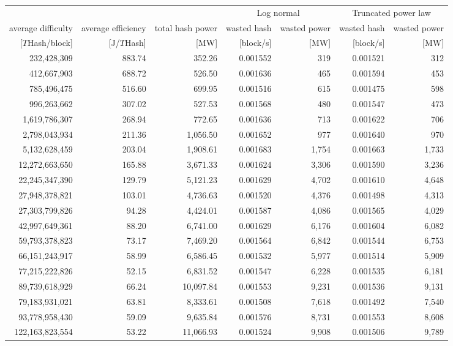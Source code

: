 \begin{tabular}{@{}rrrrrrr@{}}
\toprule
 &  &  & \multicolumn{2}{c}{Log normal} & \multicolumn{2}{c}{Truncated power law}\\
\cmidrule(lr){4-5} \cmidrule(lr){6-7} 
average difficulty & average efficiency & total hash power & wasted hash & wasted power & wasted hash & wasted power\\
$[T$Hash/block] & [J/$T$Hash] & [MW] & [block/s] & [MW] & [block/s] & [MW]\\
\cmidrule(lr){1-7}
232,428,309 & 883.74 & 352.26 & 0.001552 & 319 & 0.001521 & 312 \\
412,667,903 & 688.72 & 526.50 & 0.001636 & 465 & 0.001594 & 453 \\
785,496,475 & 516.60 & 699.95 & 0.001516 & 615 & 0.001475 & 598 \\
996,263,662 & 307.02 & 527.53 & 0.001568 & 480 & 0.001547 & 473 \\
1,619,786,307 & 268.94 & 772.65 & 0.001636 & 713 & 0.001622 & 706 \\
2,798,043,934 & 211.36 & 1,056.50 & 0.001652 & 977 & 0.001640 & 970 \\
5,132,628,459 & 203.04 & 1,908.61 & 0.001683 & 1,754 & 0.001663 & 1,733 \\
12,272,663,650 & 165.88 & 3,671.33 & 0.001624 & 3,306 & 0.001590 & 3,236 \\
22,245,347,390 & 129.79 & 5,121.23 & 0.001629 & 4,702 & 0.001610 & 4,648 \\
27,948,378,821 & 103.01 & 4,736.63 & 0.001520 & 4,376 & 0.001498 & 4,313 \\
27,303,799,826 & 94.28 & 4,424.01 & 0.001587 & 4,086 & 0.001565 & 4,029 \\
42,997,649,361 & 88.20 & 6,741.00 & 0.001629 & 6,176 & 0.001604 & 6,082 \\
59,793,378,823 & 73.17 & 7,469.20 & 0.001564 & 6,842 & 0.001544 & 6,753 \\
66,151,243,917 & 58.99 & 6,586.45 & 0.001532 & 5,977 & 0.001514 & 5,909 \\
77,215,222,826 & 52.15 & 6,831.52 & 0.001547 & 6,228 & 0.001535 & 6,181 \\
89,739,618,929 & 66.24 & 10,097.84 & 0.001553 & 9,231 & 0.001536 & 9,131 \\
79,183,931,021 & 63.81 & 8,333.61 & 0.001508 & 7,618 & 0.001492 & 7,540 \\
93,778,958,430 & 59.09 & 9,635.84 & 0.001576 & 8,731 & 0.001553 & 8,608 \\
122,163,823,554 & 53.22 & 11,066.93 & 0.001524 & 9,908 & 0.001506 & 9,789 \\

\end{tabular}
